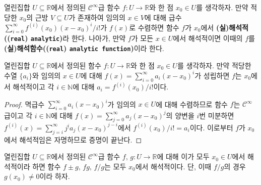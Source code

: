\begin{definition}
    열린집합 $U\subseteq\mathbb{R}$에서 정의된 $\mathcal{C}^\infty$급 함수 $f:U\to\mathbb{R}$와 한 점 $x_0\in U$를 생각하자. 만약 적당한 $x_0$의 근방 $V\subseteq U$가 존재하여 임의의 $x\in V$에 대해 급수 $\sum_{i=0}^\infty f^{(i)}(x_0)(x-x_0)^i/i!$가 $f(x)$로 수렴하면 함수 $f$가 $x_0$에서 \textbf{(실)해석적((\texttt{real}) \texttt{analytic})}라 한다. 나아가, 만약 $f$가 모든 $x\in U$에서 해석적이면 이때의 $f$를 \textbf{(실)해석함수((\texttt{real}) \texttt{analytic function})}이라 한다.
\end{definition}

\begin{theorem}\label{thm:TaylorSeries}
    열린집합 $U\subseteq\mathbb{R}$에서 정의된 함수 $f:U\to\mathbb{R}$와 한 점 $x_0\in U$를 생각하자. 만약 적당한 수열 $\{a_i\}$와 임의의 $x\in U$에 대해 $f(x)=\sum_{i=0}^\infty a_i(x-x_0)^i$가 성립하면 $f$는 $x_0$에서 해석적이고 각 $i\in\mathbb{N}$에 대해 $a_i=f^{(i)}(x_0)/i!$이다.
\end{theorem}

\begin{proof}
    멱급수 $\sum_{i=0}^\infty a_i(x-x_0)^i$가 임의의 $x\in U$에 대해 수렴하므로 함수 $f$는 $\mathcal{C}^\infty$급이고 각 $i\in\mathbb{N}$에 대해 $f(x)=\sum_{j=0}^\infty a_j(x-x_0)^j$의 양변을 $i$번 미분하면 $f^{(i)}(x)=\sum_{j=i}^\infty j^{\underline{i}}a_j(x-x_0)^{j-i}$에서 $f^{(i)}(x_0)/i!=a_i$이다. 이로부터 $f$가 $x_0$에서 해석적임은 자명하므로 증명이 끝난다.
\end{proof}

\begin{theorem}
    열린집합 $U\subseteq\mathbb{R}$에서 정의된 $\mathcal{C}^\infty$급 함수 $f,\,g:U\to\mathbb{R}$에 대해 이가 모두 $x_0\in U$에서 해석적이라 하면 함수 $f\pm g,\,fg,\,f/g$는 모두 $x_0$에서 해석적이다. 단, 이때 $f/g$의 경우 $g(x_0)\ne0$이라 하자.
\end{theorem}

